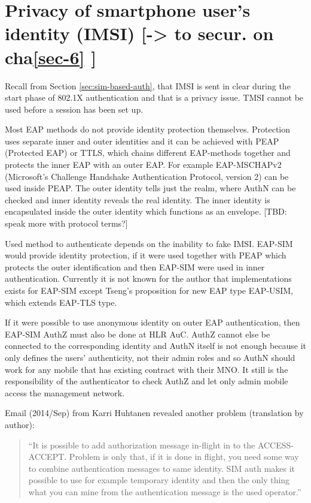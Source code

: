 \documentclass[12pt,a4paper,english]{tutthesis}
\begin{document}
\section{Privacy of smartphone user's identity (IMSI) [-> to secur. on cha\ref{sec-6} ]}
\label{sec-4-7}


Recall from Section \ref{sec:sim-based-auth}, that IMSI is sent in clear 
during the start phase of 802.1X authentication and that is a privacy 
issue. TMSI cannot be used before a session has been set up. \cite[p.66]{rfc4186}


Most EAP methods do not provide identity protection themselves. Protection
uses separate  inner and outer identities and it can be achieved with
PEAP (Protected  EAP) or TTLS, which chains different EAP-methods together and
protects the inner EAP with an outer EAP. For example 
EAP-MSCHAPv2 (Microsoft's Challenge Handshake Authentication Protocol,
version 2) can be used inside PEAP.
The outer identity tells just the realm, where AuthN can be checked
 and inner identity reveals the real identity.
The inner identity is encapsulated inside the outer identity which
functions as an envelope. [TBD: speak more with protocol terms?]


Used method to authenticate depends on the inability to fake IMSI.
EAP-SIM would provide identity protection, if it were used together
with PEAP which protects the outer identification  and
then EAP-SIM were used in inner authentication.
Currently it is not known for the author that implementations exists for
EAP-SIM  except Tseng's proposition \cite{tseng-usim} for  new EAP type
EAP-USIM, which extends EAP-TLS type.

If it were possible to use anonymous identity on outer EAP
authentication, then EAP-SIM AuthZ must also be done at HLR AuC.
AuthZ cannot else be connected to the corresponding
identity and AuthN itself is not enough because it only defines the users'
authenticity, not their admin roles and so 
AuthN should work for any mobile that has existing contract with
their MNO. 
It still is the responsibility of the authenticator to 
check AuthZ  and let only admin mobile access the management network.








Email (2014/Sep) from Karri Huhtanen revealed another
problem (translation by author):
\begin{quote}
``It is possible to add authorization message in-flight in to the
ACCESS-ACCEPT.
Problem is only that, if it is done in flight, you need some way to
combine authentication messages to same identity. SIM auth makes it
possible to use for example temporary identity and then the only thing
what you can mine from the authentication message is the used operator.''
\end{quote}
\end{document}
